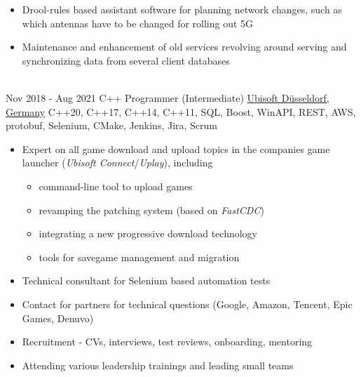 \documentclass[letterpaper]{twentysecondcv} %
\begin{document}
\begin{twenty}
{\begin{itemize}
        			\item Drool-rules based assistant software for planning network changes, such as which antennas have to
        			be changed for rolling out 5G
        			\item Maintenance and enhancement of old services revolving around serving and synchronizing data from several client databases
        		\end{itemize}}\\
     	\twentyitem
    		{Nov 2018 -}
		{Aug 2021}
        		{C++ Programmer (Intermediate)}
        		{\href{https://duesseldorf.ubisoft.com/en}{Ubisoft Düsseldorf, Germany}}
        		{C++20, C++17, C++14, C++11, SQL, Boost, WinAPI, REST, AWS, protobuf, Selenium, CMake, Jenkins, Jira, Scrum}
        		{\begin{itemize}
        			\item Expert on all game download and upload topics in the companies game launcher (\textit{Ubisoft Connect}/\textit{Uplay}), including
        			\begin{itemize}
        				\item command-line tool to upload games
        				\item revamping the patching system (based on \textit{FastCDC})
        				\item integrating a new progressive download technology
        				\item tools for savegame management and migration
        			\end{itemize}
        			\item Technical consultant for Selenium based automation tests
        			\item Contact for partners for technical questions (Google, Amazon, Tencent, Epic Games, Denuvo)
        			\item Recruitment - CVs, interviews, test reviews, onboarding, mentoring
        			\item Attending various leadership trainings and leading small teams
        		\end{itemize}}
\end{twenty}

\newpage
\makesidebarSecond %
\end{document}
